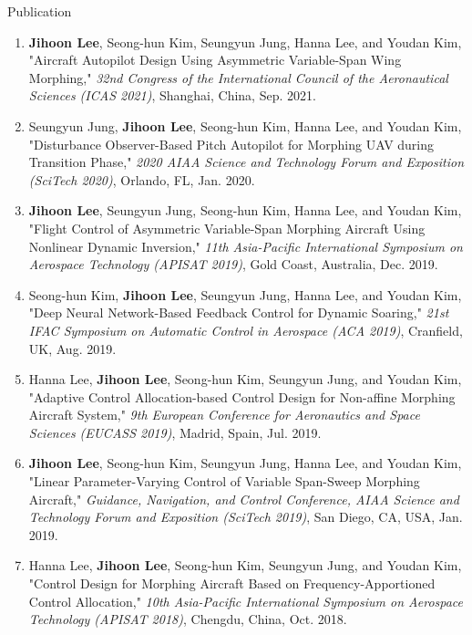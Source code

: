 \documentclass{resume} %
\begin{document}
\begin{rSection}{Publication}
\begin{enumerate}
		\item \textbf{Jihoon Lee}, Seong-hun Kim, Seungyun Jung, Hanna Lee, and Youdan Kim, "Aircraft Autopilot Design Using Asymmetric Variable-Span Wing Morphing," \textit{32nd Congress of the International Council of the Aeronautical Sciences (ICAS 2021)}, Shanghai, China, Sep. 2021. 
		
		\item Seungyun Jung, \textbf{Jihoon Lee}, Seong-hun Kim, Hanna Lee, and Youdan Kim, "Disturbance Observer-Based Pitch Autopilot for Morphing UAV during Transition Phase," \textit{2020 AIAA Science and Technology Forum and Exposition (SciTech 2020)}, Orlando, FL, Jan. 2020. \newline[DOI: 10.2514/6.2020-1087]
		
		\item \textbf{Jihoon Lee}, Seungyun Jung, Seong-hun Kim, Hanna Lee, and Youdan Kim, "Flight Control of Asymmetric Variable-Span Morphing Aircraft Using Nonlinear Dynamic Inversion," \textit{11th Asia-Pacific International Symposium on Aerospace Technology (APISAT 2019)}, Gold Coast, Australia, Dec. 2019. 
	
		\item Seong-hun Kim, \textbf{Jihoon Lee}, Seungyun Jung, Hanna Lee, and Youdan Kim, "Deep Neural Network-Based Feedback Control for Dynamic Soaring," \textit{21st IFAC Symposium on Automatic Control in Aerospace (ACA 2019)}, Cranfield, UK, Aug. 2019. 
		
		\item Hanna Lee, \textbf{Jihoon Lee}, Seong-hun Kim, Seungyun Jung, and Youdan Kim, "Adaptive Control Allocation-based Control Design for Non-affine Morphing Aircraft System," \textit{9th European Conference for Aeronautics and Space Sciences (EUCASS 2019)}, Madrid, Spain, Jul. 2019. 
		
		\item \textbf{Jihoon Lee}, Seong-hun Kim, Seungyun Jung, Hanna Lee, and Youdan Kim, "Linear Parameter-Varying Control of Variable Span-Sweep Morphing Aircraft," \textit{Guidance, Navigation, and Control Conference, AIAA Science and Technology Forum and Exposition (SciTech 2019)}, San Diego, CA, USA, Jan. 2019. \newline[DOI: 10.2514/6.2019-0106]
		
		\item Hanna Lee, \textbf{Jihoon Lee}, Seong-hun Kim, Seungyun Jung, and Youdan Kim, "Control Design for Morphing Aircraft Based on Frequency-Apportioned Control Allocation," \textit{10th Asia-Pacific International Symposium on Aerospace Technology (APISAT 2018)}, Chengdu, China, Oct. 2018. 
		

\end{enumerate}
\end{rSection}
\end{document}
